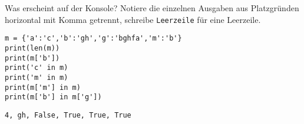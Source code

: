 \question[3] Was erscheint auf der Konsole?  
Notiere die einzelnen Ausgaben aus Platzgründen horizontal mit Komma getrennt,
schreibe \texttt{Leerzeile} für eine Leerzeile.
\begin{lstlisting}
m = {'a':'c','b':'gh','g':'bghfa','m':'b'}
print(len(m))
print(m['b'])
print('c' in m)
print('m' in m)
print(m['m'] in m)
print(m['b'] in m['g'])
\end{lstlisting}
\begin{solutionbox}{1cm}
\texttt{4, gh, False, True, True, True}
\end{solutionbox}
